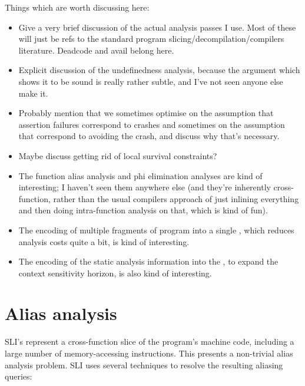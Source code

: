 Things which are worth discussing here:

\begin{itemize}
\item
  Give a very brief discussion of the actual analysis passes I use.
  Most of these will just be refs to the standard program slicing/decompilation/compilers literature.
  Deadcode and avail belong here.
\item
  Explicit discussion of the undefinedness analysis, because the argument which shows it to be sound is really rather subtle, and I've not seen anyone else make it.
\item
  Probably mention that we sometimes optimise on the assumption that assertion failures correspond to crashes and sometimes on the assumption that correspond to avoiding the crash, and discuss why that's necessary.
\item
  Maybe discuss getting rid of local survival constraints?
\item
  The function alias analysis and phi elimination analyses are kind of interesting; I haven't seen them anywhere else (and they're inherently cross-function, rather than the usual compilers approach of just inlining everything and then doing intra-function analysis on that, which is kind of fun).
\item
  The encoding of multiple fragments of program into a single \StateMachine, which reduces analysis costs quite a bit, is kind of interesting.
\item
  The encoding of the static analysis information into the \StateMachines, to expand the context sensitivity horizon, is also kind of interesting.
\end{itemize}

\section{Alias analysis}

SLI's \StateMachines represent a cross-function slice of the program's
machine code, including a large number of memory-accessing
instructions.  This presents a non-trivial alias analysis problem.
SLI uses several techniques to resolve the resulting aliasing queries:

